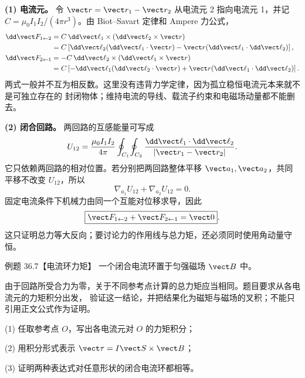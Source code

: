 \begin{xesolution}
\textbf{(1) 电流元。} 令 $\vect r=\vect r_1-\vect r_2$ 从电流元 2 指向电流元 1，并记
$C=\mu_0I_1I_2/(4\pi r^3)$。由 Biot--Savart 定律和 Ampere 力公式，
\begin{align}
  \dd\vect F_{1\leftarrow2}
  &=C\,\dd\vect\ell_1\times(\dd\vect\ell_2\times\vect r)\\
  &=C\left[\dd\vect\ell_2(\dd\vect\ell_1\cdot\vect r)
  -\vect r(\dd\vect\ell_1\cdot\dd\vect\ell_2)\right],\\
  \dd\vect F_{2\leftarrow1}
  &=-C\,\dd\vect\ell_2\times(\dd\vect\ell_1\times\vect r)\\
  &=C\left[-\dd\vect\ell_1(\dd\vect\ell_2\cdot\vect r)
  +\vect r(\dd\vect\ell_1\cdot\dd\vect\ell_2)\right].
\end{align}
两式一般并不互为相反数。这里没有违背力学定律，因为孤立稳恒电流元本来就不是可独立存在的
封闭物体；维持电流的导线、载流子约束和电磁场动量都不能删去。

\currentElementsDiagram

\textbf{(2) 闭合回路。} 两回路的互感能量可写成
\begin{equation}
  U_{12}=\frac{\mu_0I_1I_2}{4\pi}
  \oint_{C_1}\!\oint_{C_2}
  \frac{\dd\vect\ell_1\cdot\dd\vect\ell_2}{|\vect r_1-\vect r_2|}.
\end{equation}
它只依赖两回路的相对位置。若分别把两回路整体平移 $\vect a_1,\vect a_2$，共同平移不改变
$U_{12}$，所以
\[
  \nabla_{\!a_1}U_{12}+\nabla_{\!a_2}U_{12}=0.
\]
固定电流条件下机械力由同一个互能对位移求导，因此
\begin{equation}
  \boxed{\vect F_{1\leftarrow2}+\vect F_{2\leftarrow1}=\vect0}.
\end{equation}
这只证明总力等大反向；要讨论力的作用线与总力矩，还必须同时使用角动量守恒。
\end{xesolution}

\Needspace{0.18\textheight}
\begin{origexamplebox}{例题 36.7【电流环力矩】}
一个闭合电流环置于匀强磁场 $\vect B$ 中。

由于回路所受合力为零，关于不同参考点计算的总力矩应当相同。题目要求从各电流元的力矩积分出发，
验证这一结论，并把结果化为磁矩与磁场的叉积；不能只引用正文公式作为证明。

(1) 任取参考点 $O$，写出各电流元对 $O$ 的力矩积分；

(2) 用积分形式表示 $\vect\tau=I\vect S\times\vect B$；

(3) 证明两种表达式对任意形状的闭合电流环都相等。
\end{origexamplebox}

